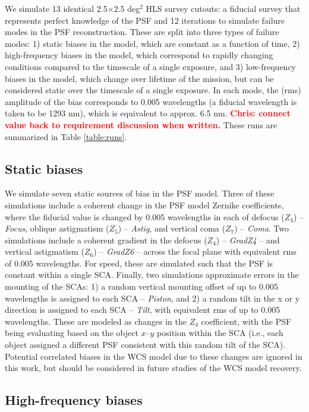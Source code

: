 \documentclass[aps,prd, amsmath,amssymb,superscriptaddress,showkeys,nofootinbib,reprint,preprintnumbers]{revtex4-1}
\newcommand{\verify}[1]{\textcolor{red}{\textbf{{#1}}}}
\begin{document}
We simulate 13 identical 2.5$\times$2.5 deg$^2$ HLS survey cutouts: a fiducial survey that represents perfect knowledge of the PSF and 12 iterations to simulate failure modes in the PSF reconstruction. 
These are split into three types of failure modes: 1) static biases in the model, which are constant as a function of time, 2) high-frequency biases in the model, which correspond to rapidly changing conditions compared to the timescale of a single exposure, and 3) low-frequency biases in the model, which change over lifetime of the mission, but can be considered static over the timescale of a single exposure. 
In each mode, the (rms) amplitude of the bias corresponds to 0.005 wavelengths (a fiducial wavelength is taken to be 1293 nm), which is equivalent to approx. 6.5 nm. 
\verify{Chris: connect value back to requirement discussion when written.} These runs are summarized in Table \ref{table:runs}.

\subsection{Static biases}\label{sec:static}

We simulate seven static sources of bias in the PSF model. 
Three of these simulations include a coherent change in the PSF model Zernike coefficients, where the fiducial value is changed by 0.005 wavelengths in each of defocus ($Z_4$) -- \emph{Focus}, oblique astigmatism ($Z_5$) -- \emph{Astig}, and vertical coma ($Z_7$) -- \emph{Coma}. 
Two simulations include a coherent gradient in the defocus ($Z_4$) -- \emph{GradZ4} -- and vertical astigmatism ($Z_6$) -- \emph{GradZ6} -- across the focal plane with equivalent rms of 0.005 wavelengths. 
For speed, these are simulated such that the PSF is constant within a single SCA. Finally, two simulations approximate errors in the mounting of the SCAs: 1) a random vertical mounting offset of up to 0.005 wavelengths is assigned to each SCA  -- \emph{Piston}, and 2) a random tilt in the x or y direction is assigned to each SCA  -- \emph{Tilt}, with equivalent rms of up to 0.005 wavelengths. 
These are modeled as changes in the $Z_4$ coefficient, with the PSF being evaluating based on the object $x$--$y$ position within the SCA (i.e., each object assigned a different PSF consistent with this random tilt of the SCA). 
Potential correlated biases in the WCS model due to these changes are ignored in this work, but should be considered in future studies of the WCS model recovery.

\subsection{High-frequency biases}\label{sec:low}
\end{document}
